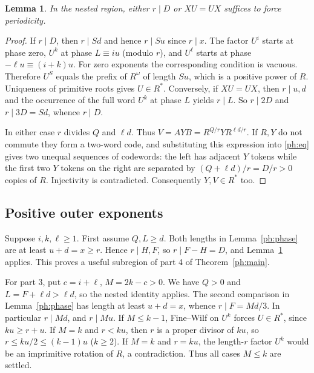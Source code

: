 \documentclass[10pt]{article}
\newtheorem{lemma}[theorem]{Lemma}
\theoremstyle{remark}\newtheorem*{remark}{Remark}
\begin{document}
\begin{lemma}\label{ph:prop}
In the nested region, either $r\mid D$ or $XU=UX$ suffices to force
periodicity.
\end{lemma}
\begin{proof}
If $r\mid D$, then $r\mid Sd$ and hence $r\mid Su$ since $r\mid x$.
The factor $U^i$ starts at phase zero, $U^k$ at phase $L\equiv iu$
(modulo $r$), and $U^\ell$ starts at phase $-\ell u\equiv(i+k)u$.
For zero exponents the corresponding condition is vacuous. Therefore
$U^S$ equals the prefix of $R^\omega$ of length $Su$, which is a
positive power of $R$. Uniqueness of primitive roots gives $U\in R^*$.
Conversely, if $XU=UX$, then $r\mid u,d$ and the occurrence of the
full word $U^k$ at phase $L$ yields $r\mid L$. So $r\mid2D$ and
$r\mid3D=Sd$, whence $r\mid D$.

In either case $r$ divides $Q$ and $\ell d$. Thus
$V=AYB=R^{Q/r}Y R^{\ell d/r}$. If $R,Y$ do not commute they form a
two-word code, and substituting this expression into \eqref{ph:eq}
gives two unequal sequences of codewords: the left has adjacent
$Y$ tokens while the first two $Y$ tokens on the right are separated
by $(Q+\ell d)/r=D/r>0$ copies of $R$. Injectivity is contradicted.
Consequently $Y,V\in R^*$ too.
\end{proof}

\subsection{Positive outer exponents}
Suppose $i,k,\ell\ge1$. First assume $Q,L\ge d$. Both lengths in
Lemma~\ref{ph:phase} are at least $u+d=x\ge r$. Hence $r\mid H,F$,
so $r\mid F-H=D$, and Lemma~\ref{ph:prop} applies. This proves a useful subregion of part 4 of Theorem~\ref{ph:main}.

For part 3, put $c=i+\ell$, $M=2k-c>0$. We have $Q>0$ and
$L=F+\ell d>\ell d$, so the nested identity applies. The second
comparison in Lemma~\ref{ph:phase} has length at least $u+d=x$,
whence $r\mid F=Md/3$. In particular $r\mid Md$, and $r\mid Mu$.
If $M\le k-1$, Fine--Wilf on $U^k$ forces $U\in R^*$, since
$ku\ge r+u$. If $M=k$ and $r<ku$, then $r$ is a proper divisor
of $ku$, so $r\le ku/2\le(k-1)u$ ($k\ge2$). If $M=k$ and $r=ku$,
the length-$r$ factor $U^k$ would be an imprimitive rotation of $R$,
a contradiction. Thus all cases $M\le k$ are settled.
\end{document}
